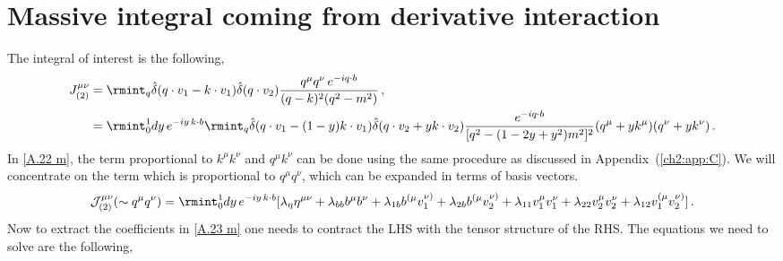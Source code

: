 \section{Massive integral coming from derivative interaction} \label{ch2:app:E}
The integral of interest is the following,
\begin{align}
    \begin{split}
        J_{(2)}^{\mu\nu}&= \rmint_{q}\hat\delta(q\cdot v_1-k\cdot v_1)\hat\delta(q\cdot v_2)\frac{q^\mu q^\nu\,e^{-i q\cdot b}}{(q-k)^2 (q^2-m^2)}\,,\\ &
        =\rmint_0^1 dy\,e^{-iy\,k\cdot b}\rmint_q \hat\delta(q\cdot v_1-(1-y)k\cdot v_1)\hat\delta(q\cdot v_2+yk\cdot v_2)\frac{e^{-i q\cdot b}}{[q^2-(1-2y+y^2)m^2]^2}(q^{\mu}+yk^\mu)(q^{\nu}+yk^\nu)\,.\label{A.22 m}
    \end{split}
\end{align}
In \eqref{A.22 m}, the term proportional to $k^\mu k^\nu$ and $q^{\mu} k^\nu$ can be done using the same procedure as discussed in Appendix~(\ref{ch2:app:C}). We will concentrate on the term which is proportional to $q^\mu q^\nu$, which can be expanded in terms of basis vectors.
\begin{align}
    \begin{split}
        \mathcal{J}_{(2)}^{\mu\nu}(\sim q^\mu q^\nu)=\rmint_0^1 dy\, e^{-iy\,k\cdot b}[\lambda_{\eta}\eta^{\mu\nu}+\lambda_{bb}b^\mu b^\nu+\lambda_{1b}b^{(\mu}v_1^{\nu)}+\lambda_{2b}b^{(\mu}v_2^{\nu)}+\lambda_{11}v_1^\mu v_1^\nu+\lambda_{22}v_2^\mu v_2^\nu+\lambda_{12}v_1^{(\mu}v_2^{\nu)}]\,.\label{A.23 m}
    \end{split}
\end{align}
Now to extract the coefficients in \eqref{A.23 m} one needs to contract the LHS with the tensor structure of the RHS. The equations we need to solve are the following,

